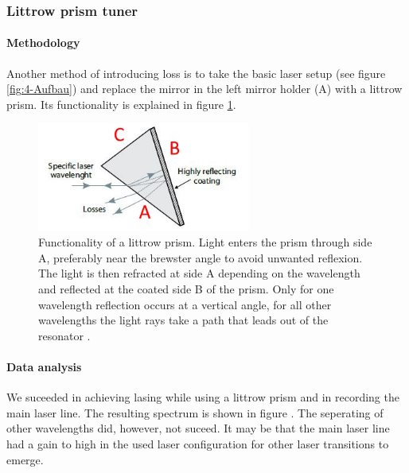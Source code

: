 \documentclass[../main.tex]{subfiles}
\begin{document}
\subsubsection{Littrow prism tuner}
    \paragraph{Methodology}
        Another method of introducing loss is to take the basic laser setup (see figure \ref{fig:4-Aufbau}) and replace the mirror in the left mirror holder (A) with a littrow prism. Its functionality is explained in figure \ref{fig:5-FunktionsweiseLitrrowprisma}.

        \begin{figure}[H]
            \centering 
            \includegraphics[width = 7cm]{Bilddateien/5/5-FunktionsweiseLitrrowprisma.jpg}
            \caption{Functionality of a littrow prism. Light enters the prism through side A, preferably near the brewster angle to avoid unwanted reflexion. The light is then refracted at side A depending on the wavelength and reflected at the coated side B of the prism. Only for one wavelength reflection occurs at a vertical angle, for all other wavelengths the light rays take a path that leads out of the resonator \cite{web:Littrow}.}
            \label{fig:5-FunktionsweiseLitrrowprisma}
        \end{figure}

    \paragraph{Data analysis}
        We suceeded in achieving lasing while using a littrow prism and in recording the main laser line. The resulting spectrum is shown in figure . The seperating of other wavelengths did, however, not suceed. It may be that the main laser line had a gain to high in the used laser configuration for other laser transitions to emerge.
\end{document}
